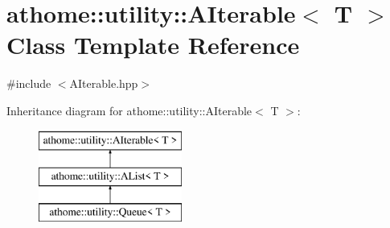 \hypertarget{classathome_1_1utility_1_1_a_iterable}{}\section{athome\+:\+:utility\+:\+:A\+Iterable$<$ T $>$ Class Template Reference}
\label{classathome_1_1utility_1_1_a_iterable}


{\ttfamily \#include $<$A\+Iterable.\+hpp$>$}

Inheritance diagram for athome\+:\+:utility\+:\+:A\+Iterable$<$ T $>$\+:\begin{figure}[H]
\begin{center}
\leavevmode
\includegraphics[height=3.000000cm]{classathome_1_1utility_1_1_a_iterable}
\end{center}
\end{figure}
